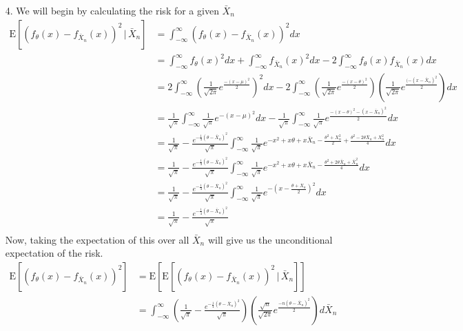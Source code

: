 \documentclass[11pt]{article}
\newcommand{\E}{\mathrm{E}}
\theoremstyle{definition}
\begin{document}
\begin{itemize}
    \item[4.]
        We will begin by calculating the risk for a given \(\bar X_n\) \\
        \begin{align*}
            \E\left[\left(f_\theta(x) - f_{\bar X_n}(x)\right)^2\,|\, \bar X_n\right] 
            &= \int_{-\infty}^\infty (f_\theta(x) - f_{\bar X_n}(x))^2 dx \\
            &=\int_{-\infty}^\infty f_\theta(x)^2 dx + \int_{-\infty}^\infty f_{\bar X_n}(x)^2 dx - 2\int_{-\infty}^\infty f_\theta(x) f_{\bar X_n}(x) dx \\
            &=2\int_{-\infty}^\infty \left( \frac{1}{\sqrt{2\pi}} e^{\frac{-(x-\mu)^2}{2}} \right )^2 dx - 2\int_{-\infty}^\infty \left( \frac{1}{\sqrt{2\pi}} e^{\frac{-(x-\theta)^2}{2}} \right) \left( \frac{1}{\sqrt{2\pi}} e^{\frac{(-(x-\bar X_n)^2}{2}} \right) dx \\
            &=\frac{1}{\sqrt{\pi}}\int_{-\infty}^\infty \frac{1}{\sqrt{\pi}} e^{-(x-\mu)^2} dx -  \frac{1}{\sqrt{\pi}}\int_{-\infty}^\infty \frac{1}{\sqrt{\pi}} e^{\frac{-(x-\theta)^2-(x-\bar X_n)^2}{2}}  dx \\
            &=\frac{1}{\sqrt{\pi}} - \frac{e^{-\frac{1}{4}(\theta-\bar X_n)^2}}{\sqrt{\pi}}\int_{-\infty}^\infty \frac{1}{\sqrt{\pi}} e^{-x^2+x\theta+x\bar X_n-\frac{\theta^2+X_n^2}{2}+\frac{\theta^2-2\theta\bar X_n+X_n^2}{4}}  dx \\
            &=\frac{1}{\sqrt{\pi}} - \frac{e^{-\frac{1}{4}(\theta-\bar X_n)^2}}{\sqrt{\pi}}\int_{-\infty}^\infty \frac{1}{\sqrt{\pi}} e^{-x^2+x\theta+x\bar X_n-\frac{\theta^2+2\theta\bar X_n+\bar X_n^2}{4}}  dx \\
            &=\frac{1}{\sqrt{\pi}} - \frac{e^{-\frac{1}{4}(\theta-\bar X_n)^2}}{\sqrt{\pi}}\int_{-\infty}^\infty \frac{1}{\sqrt{\pi}} e^{-(x-\frac{\theta+X_n}{2})^2}  dx \\
            &=\frac{1}{\sqrt{\pi}} - \frac{e^{-\frac{1}{4}(\theta-\bar X_n)^2}}{\sqrt{\pi}} \\
        \end{align*}
        Now, taking the expectation of this over all \(\bar X_n\) will give us the unconditional expectation of the risk.
        \begin{align*}
            \E\left[\left(f_\theta(x) - f_{\bar X_n}(x)\right)^2 \right] 
            &=\E\left[\E\left[\left(f_\theta(x) - f_{\bar X_n}(x)\right)^2\,|\, \bar X_n\right]\right] \\
            &= \int_{-\infty}^\infty \left( \frac{1}{\sqrt{\pi}} - \frac{e^{-\frac{1}{4}(\theta-\bar X_n)^2}}{\sqrt{\pi}} \right)  \left(\frac{\sqrt{n}}{\sqrt{2\pi}} e^{\frac{-n(\theta-\bar X_n)^2}{2}}\right) d\bar X_n  \\

\end{align*}
\end{itemize}
\end{document}
